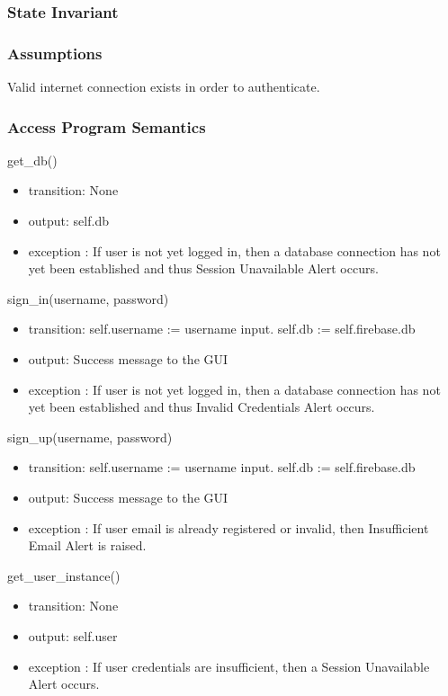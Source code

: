 \documentclass[12pt, titlepage]{article}
\begin{document}
\subsubsection{State Invariant}

\subsubsection{Assumptions}
Valid internet connection exists in order to authenticate.

\subsubsection{Access Program Semantics}
 get\_db()
\begin{itemize}
    \item transition: None 
    \item output: self.db
    \item exception : If user is not yet logged in, then a database connection has not yet been established and thus Session Unavailable Alert occurs.
\end{itemize}

sign\_in(username, password)
\begin{itemize}
    \item transition: self.username := username input.  self.db := self.firebase.db
    \item output: Success message to the GUI
    \item exception : If user is not yet logged in, then a database connection has not yet been established and thus Invalid Credentials Alert occurs.
\end{itemize}


sign\_up(username, password)
\begin{itemize}
    \item transition: self.username := username input.  self.db := self.firebase.db
    \item output: Success message to the GUI
    \item exception : If user email is already registered or invalid, then Insufficient Email Alert is raised.
\end{itemize}

 get\_user\_instance()
 \begin{itemize}
    \item transition: None
    \item output: self.user
    \item exception : If user credentials are insufficient, then a Session Unavailable Alert occurs.
\end{itemize}
\end{document}
